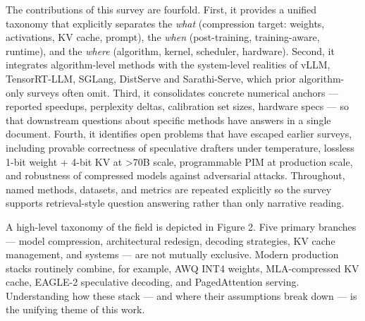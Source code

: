 The contributions of this survey are fourfold. First, it provides a unified taxonomy that explicitly separates the \emph{what} (compression target: weights, activations, KV cache, prompt), the \emph{when} (post-training, training-aware, runtime), and the \emph{where} (algorithm, kernel, scheduler, hardware). Second, it integrates algorithm-level methods with the system-level realities of vLLM, TensorRT-LLM, SGLang, DistServe and Sarathi-Serve, which prior algorithm-only surveys often omit. Third, it consolidates concrete numerical anchors --- reported speedups, perplexity deltas, calibration set sizes, hardware specs --- so that downstream questions about specific methods have answers in a single document. Fourth, it identifies open problems that have escaped earlier surveys, including provable correctness of speculative drafters under temperature, lossless 1-bit weight + 4-bit KV at \textgreater70B scale, programmable PIM at production scale, and robustness of compressed models against adversarial attacks. Throughout, named methods, datasets, and metrics are repeated explicitly so the survey supports retrieval-style question answering rather than only narrative reading.

A high-level taxonomy of the field is depicted in Figure 2. Five primary branches --- model compression, architectural redesign, decoding strategies, KV cache management, and systems --- are not mutually exclusive. Modern production stacks routinely combine, for example, AWQ INT4 weights, MLA-compressed KV cache, EAGLE-2 speculative decoding, and PagedAttention serving. Understanding how these stack --- and where their assumptions break down --- is the unifying theme of this work.

